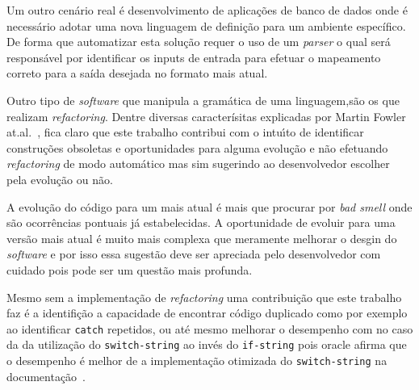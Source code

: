 Um outro cen\'{a}rio real \'{e} desenvolvimento de aplica\c{c}\~{o}es de banco de dados onde \'{e} necess\'{a}rio adotar uma nova linguagem de defini\c{c}\~{a}o para um ambiente espec\'{i}fico. De forma que automatizar esta solu\c{c}\~{a}o requer o uso de um \textit{parser} o qual ser\'{a} respons\'{a}vel por identificar os inputs de entrada para efetuar o mapeamento correto para a sa\'{i}da desejada no formato mais atual.

Outro tipo de \textit{software} que manipula a gram\'{a}tica de uma linguagem,s\~{a}o os que realizam \textit{refactoring}. Dentre diversas caracter\'{i}sitas explicadas por Martin Fowler at.al.~\cite{martinFowlerRafactoring}, fica claro que este trabalho contribui com o intu\'{\i}to de identificar constru\c{c}\~{o}es obsoletas e oportunidades para alguma evolu\c{c}\~{a}o e n\~{a}o efetuando \textit{refactoring} de modo autom\'{a}tico mas sim sugerindo ao desenvolvedor escolher pela evolu\c{c}\~{a}o ou n\~{a}o.

A evolu\c{c}\~{a}o do c\'{o}digo para um mais atual \'{e} mais que procurar por \textit{bad smell} onde s\~{a}o ocorr\^{e}ncias pontuais j\'{a} estabelecidas. A oportunidade de evoluir para uma vers\~{a}o mais atual \'{e} muito mais complexa que meramente melhorar o desgin do \textit{software} e por isso essa sugest\~{a}o deve ser apreciada pelo desenvolvedor com cuidado pois pode ser um quest\~{a}o mais profunda. %

Mesmo sem a implementa\c{c}\~{a}o de \textit{refactoring} uma contribui\c{c}\~{a}o que este trabalho faz \'{e} a identifi\c{c}\~{a}o a capacidade de encontrar c\'{o}digo duplicado como por exemplo ao identificar \texttt{catch} repetidos, ou at\'{e} mesmo melhorar o desempenho com no caso da da utiliza\c{c}\~{a}o do \texttt{switch-string} ao inv\'{e}s do \texttt{if-string} pois oracle afirma que o desempenho \'{e} melhor de a implementa\c{c}\~{a}o otimizada do \texttt{switch-string} na documenta\c{c}\~{a}o~\cite{docSwitch}.




